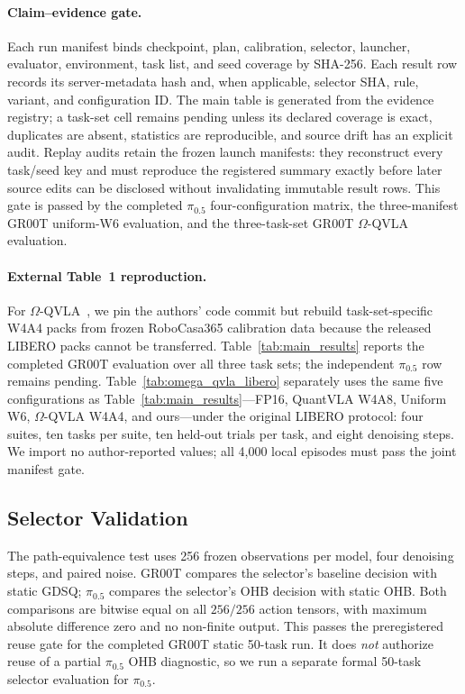 \paragraph{Claim--evidence gate.}
Each run manifest binds checkpoint, plan, calibration, selector, launcher, evaluator, environment, task list, and seed coverage by SHA-256. Each result row records its server-metadata hash and, when applicable, selector SHA, rule, variant, and configuration ID. The main table is generated from the evidence registry; a task-set cell remains pending unless its declared coverage is exact, duplicates are absent, statistics are reproducible, and source drift has an explicit audit. Replay audits retain the frozen launch manifests: they reconstruct every task/seed key and must reproduce the registered summary exactly before later source edits can be disclosed without invalidating immutable result rows. This gate is passed by the completed $\pi_{0.5}$ four-configuration matrix, the three-manifest GR00T uniform-W6 evaluation, and the three-task-set GR00T $\Omega$-QVLA evaluation.

\paragraph{External Table~1 reproduction.}
For $\Omega$-QVLA~\cite{wang2026omegaqvla}, we pin the authors' code commit but rebuild task-set-specific W4A4 packs from frozen RoboCasa365 calibration data because the released LIBERO packs cannot be transferred. Table~\ref{tab:main_results} reports the completed GR00T evaluation over all three task sets; the independent $\pi_{0.5}$ row remains pending. Table~\ref{tab:omega_qvla_libero} separately uses the same five configurations as Table~\ref{tab:main_results}---FP16, QuantVLA W4A8, Uniform W6, $\Omega$-QVLA W4A4, and ours---under the original LIBERO protocol: four suites, ten tasks per suite, ten held-out trials per task, and eight denoising steps. We import no author-reported values; all 4,000 local episodes must pass the joint manifest gate.

\subsection{Selector Validation}
\label{sec:selector_validation}

The path-equivalence test uses 256 frozen observations per model, four denoising steps, and paired noise. GR00T compares the selector's baseline decision with static GDSQ; $\pi_{0.5}$ compares the selector's OHB decision with static OHB. Both comparisons are bitwise equal on all $256/256$ action tensors, with maximum absolute difference zero and no non-finite output. This passes the preregistered reuse gate for the completed GR00T static 50-task run. It does \emph{not} authorize reuse of a partial $\pi_{0.5}$ OHB diagnostic, so we run a separate formal 50-task selector evaluation for $\pi_{0.5}$.

